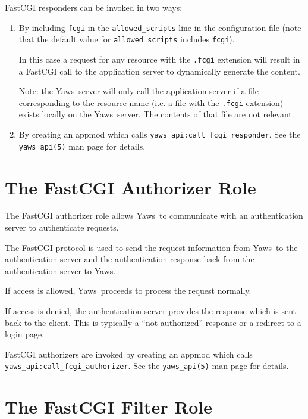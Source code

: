 \documentclass[11pt,oneside,english]{book}
\newcommand{\Yaws}            %
        {{\sc Yaws}}
\begin{document}
FastCGI responders can be invoked in two ways:

\begin{enumerate}

\item
By including \verb+fcgi+ in the \verb+allowed_scripts+ line
in the configuration file (note that the default value for
\verb+allowed_scripts+ includes \verb+fcgi+).

In this case a request for any resource with the \verb+.fcgi+
extension will result in a FastCGI call to the application server to
dynamically generate the content.

Note: the \Yaws\  server will only call the application server if a file
corresponding to the resource name (i.e. a file with the \verb+.fcgi+
extension) exists locally on the \Yaws\  server. The contents of that
file are not relevant.

\item
By creating an appmod which calls \verb+yaws_api:call_fcgi_responder+.
See the \verb+yaws_api(5)+ man page for details.

\end{enumerate}

\section{The FastCGI Authorizer Role}

The FastCGI authorizer role allows \Yaws\  to communicate with an
authentication server to authenticate requests.

The FastCGI protocol is used to send the request information from
\Yaws\ to the authentication server and the authentication response
back from the authentication server to \Yaws{}.

If access is allowed, \Yaws\ proceeds to process the request normally.

If access is denied, the authentication server provides the
response which is sent back to the client. This is typically
a ``not authorized'' response or a redirect to a login page.

FastCGI authorizers are invoked by creating an appmod which
calls \verb+yaws_api:call_fcgi_authorizer+.
See the \verb+yaws_api(5)+ man page for details.

\section{The FastCGI Filter Role}
\end{document}
